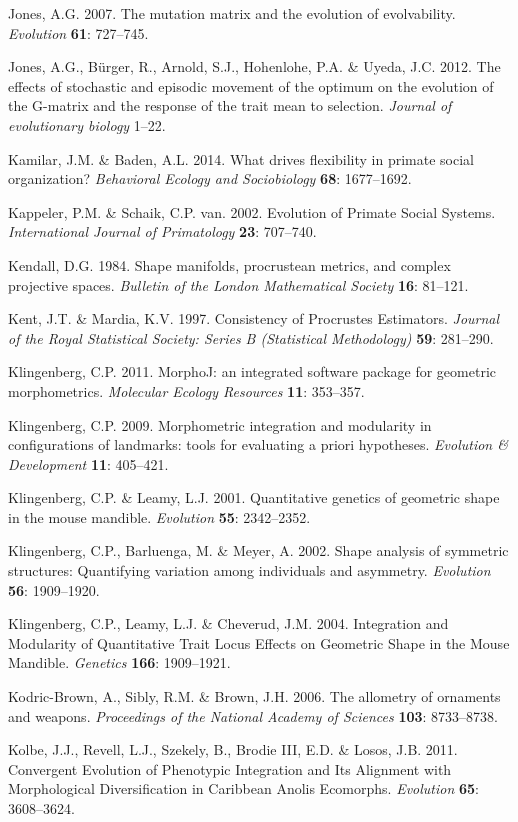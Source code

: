 \documentclass[12pt,twoside]{report}
\begin{document}
Jones, A.G. 2007. The mutation matrix and the evolution of evolvability.
\emph{Evolution} \textbf{61}: 727--745.

Jones, A.G., Bürger, R., Arnold, S.J., Hohenlohe, P.A. \& Uyeda, J.C.
2012. The effects of stochastic and episodic movement of the optimum on
the evolution of the G-matrix and the response of the trait mean to
selection. \emph{Journal of evolutionary biology} 1--22.

Kamilar, J.M. \& Baden, A.L. 2014. What drives flexibility in primate
social organization? \emph{Behavioral Ecology and Sociobiology}
\textbf{68}: 1677--1692.

Kappeler, P.M. \& Schaik, C.P. van. 2002. Evolution of Primate Social
Systems. \emph{International Journal of Primatology} \textbf{23}:
707--740.

Kendall, D.G. 1984. Shape manifolds, procrustean metrics, and complex
projective spaces. \emph{Bulletin of the London Mathematical Society}
\textbf{16}: 81--121.

Kent, J.T. \& Mardia, K.V. 1997. Consistency of Procrustes Estimators.
\emph{Journal of the Royal Statistical Society: Series B (Statistical
Methodology)} \textbf{59}: 281--290.

Klingenberg, C.P. 2011. MorphoJ: an integrated software package for
geometric morphometrics. \emph{Molecular Ecology Resources} \textbf{11}:
353--357.

Klingenberg, C.P. 2009. Morphometric integration and modularity in
configurations of landmarks: tools for evaluating a priori hypotheses.
\emph{Evolution \& Development} \textbf{11}: 405--421.

Klingenberg, C.P. \& Leamy, L.J. 2001. Quantitative genetics of
geometric shape in the mouse mandible. \emph{Evolution} \textbf{55}:
2342--2352.

Klingenberg, C.P., Barluenga, M. \& Meyer, A. 2002. Shape analysis of
symmetric structures: Quantifying variation among individuals and
asymmetry. \emph{Evolution} \textbf{56}: 1909--1920.

Klingenberg, C.P., Leamy, L.J. \& Cheverud, J.M. 2004. Integration and
Modularity of Quantitative Trait Locus Effects on Geometric Shape in the
Mouse Mandible. \emph{Genetics} \textbf{166}: 1909--1921.

Kodric-Brown, A., Sibly, R.M. \& Brown, J.H. 2006. The allometry of
ornaments and weapons. \emph{Proceedings of the National Academy of
Sciences} \textbf{103}: 8733--8738.

Kolbe, J.J., Revell, L.J., Szekely, B., Brodie III, E.D. \& Losos, J.B.
2011. Convergent Evolution of Phenotypic Integration and Its Alignment
with Morphological Diversification in Caribbean Anolis Ecomorphs.
\emph{Evolution} \textbf{65}: 3608--3624.
\end{document}

